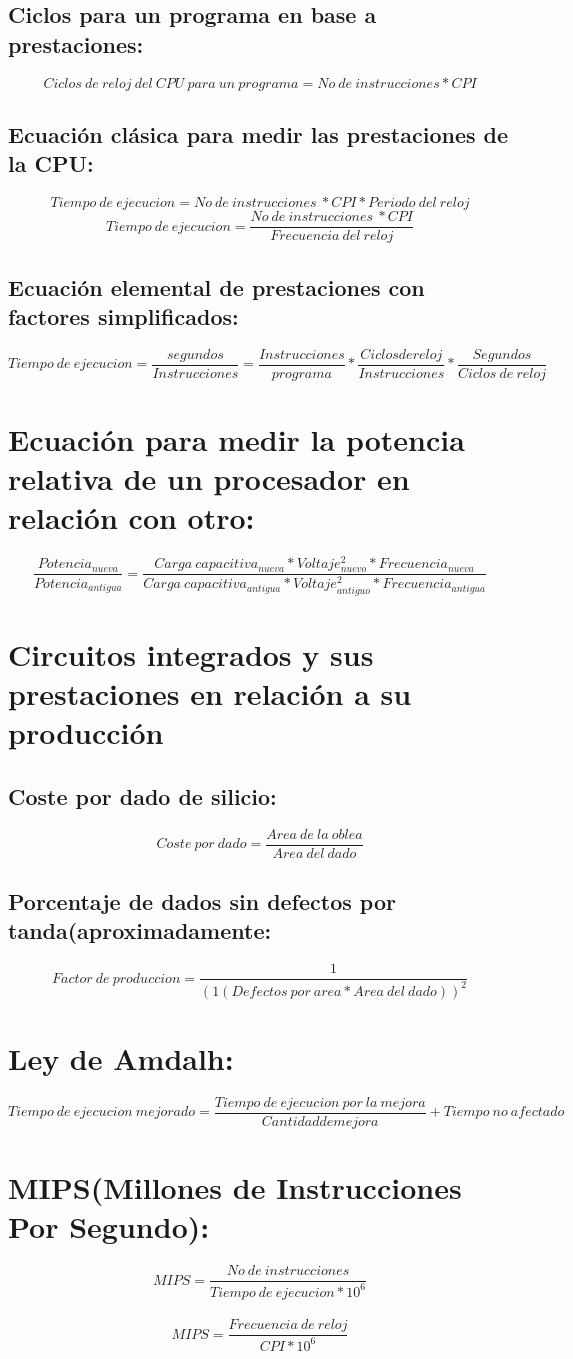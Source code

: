 \documentclass{article}
\begin{document}
\subsection{Ciclos para un programa en base a prestaciones:}
$$
Ciclos\ de\ reloj\ del\ CPU\ para\ un\ programa = No\ de\ instrucciones * CPI
$$

\subsection{Ecuación clásica para medir las prestaciones de la CPU:}
$$
Tiempo\ de\ ejecucion = No\ de\ instrucciones\ * CPI * Periodo\ del\ reloj
$$
$$
Tiempo\ de\ ejecucion = \frac{No\ de\ instrucciones\ * CPI}{Frecuencia\ del\ reloj}
$$ 

\subsection{Ecuación elemental de prestaciones con factores simplificados:}
$$
Tiempo\ de\ ejecucion = \frac{segundos}{Instrucciones} = \frac{Instrucciones}{programa} * \frac{Ciclos de reloj}{Instrucciones} * \frac{Segundos}{Ciclos\ de\ reloj}
$$

\section{Ecuación para medir la potencia relativa de un procesador en
relación con otro:}
$$
\frac{Potencia_{nueva}}{Potencia_{antigua}} = \frac{Carga\ capacitiva_{nueva} * Voltaje^2_{nuevo} * Frecuencia_{nueva}}{Carga\ capacitiva_{antigua} * Voltaje^2_{antiguo} * Frecuencia_{antigua}}
$$

\section{Circuitos integrados y sus prestaciones en relación a su producción}

\subsection{Coste por dado de silicio:}
$$
Coste\ por\ dado = \frac{Area\ de\ la\ oblea}{Area\ del\ dado}
$$

\subsection{Porcentaje de dados sin defectos por tanda(aproximadamente:}
$$
Factor\ de\ produccion = \frac{1}{(1 (Defectos\ por\ area * Area\ del\ dado))^2}
$$

\section{Ley de Amdalh:}
$$
Tiempo\ de\ ejecucion\ mejorado = \frac{Tiempo\ de\ ejecucion\ por\ la\ mejora}{Cantidad de mejora} + Tiempo\ no\ afectado
$$
\section{MIPS(Millones de Instrucciones Por Segundo):}
$$
MIPS = \frac{No\ de\ instrucciones}{Tiempo\ de\ ejecucion * 10^6}
$$
\\
$$
MIPS = \frac{Frecuencia\ de\ reloj}{CPI * 10^6}
$$
\end{document}
